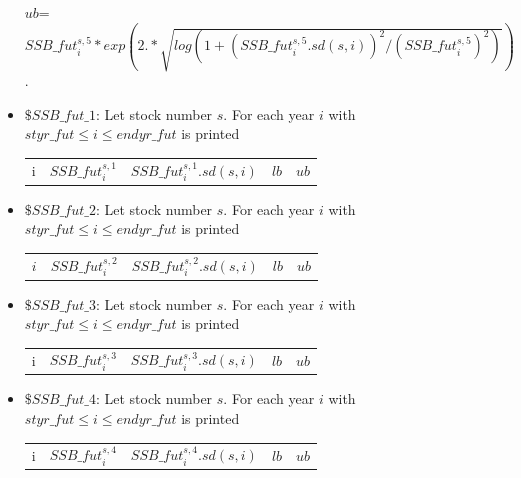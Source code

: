 \documentclass{article}
\begin{document}
\begin{itemize}
$ub$=${SSB\_fut^{s,5}_i}*{exp\left(2.*\sqrt{log(1+{(SSB\_fut^{s,5}_i.sd(s,i))}^2/{(SSB\_fut^{s,5}_i)}^2)}\right)}$. 

\item $\$ SSB\_fut\_1$: Let stock number $s$. For each year $i$ with $styr\_fut \leq i \leq endyr\_fut$ is printed

\begin{center}
    \begin{tabular}{c c c c c}
       i  & $SSB\_fut^{s,1}_i$ & $SSB\_fut^{s,1}_i.sd(s,i)$ 
         & $lb$ & $ub$ \\
    \end{tabular}
\end{center}


\item $\$ SSB\_fut\_2$: Let stock number $s$. For each year $i$ with $styr\_fut \leq i \leq endyr\_fut$ is printed

\begin{center}
    \begin{tabular}{c c c c c}
       $i$  & $SSB\_fut^{s,2}_i$ & $SSB\_fut^{s,2}_i.sd(s,i)$ 
         & $lb$ & $ub$ \\
    \end{tabular}
\end{center}


\item $\$ SSB\_fut\_3$: Let stock number $s$. For each year $i$ with $styr\_fut \leq i \leq endyr\_fut$ is printed

\begin{center}
    \begin{tabular}{c c c c c}
       i  & $SSB\_fut^{s,3}_i$ & $SSB\_fut^{s,3}_i.sd(s,i)$ 
         & $lb$ & $ub$ \\
    \end{tabular}
\end{center}



\item $\$ SSB\_fut\_4$: Let stock number $s$. For each year $i$ with $styr\_fut \leq i \leq endyr\_fut$ is printed

\begin{center}
    \begin{tabular}{c c c c c}
       i  & $SSB\_fut^{s,4}_i$ & $SSB\_fut^{s,4}_i.sd(s,i)$ 
         & $lb$ & $ub$ \\
    \end{tabular}
\end{center}





\end{itemize}
\end{document}

